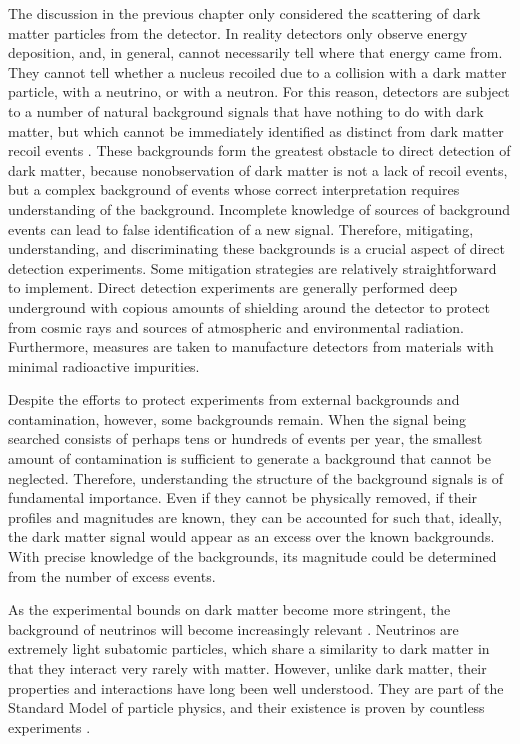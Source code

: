 The discussion in the previous chapter only considered the scattering of dark matter particles from the detector. In reality detectors only observe energy deposition, and, in general, cannot necessarily tell where that energy came from. They cannot tell whether a nucleus recoiled due to a collision with a dark matter particle, with a neutrino, or with a neutron. For this reason, detectors are subject to a number of natural background signals that have nothing to do with dark matter, but which cannot be immediately identified as distinct from dark matter recoil events \parencite{BaxterEtAl2022}. These backgrounds form the greatest obstacle to direct detection of dark matter, because nonobservation of dark matter is not a lack of recoil events, but a complex background of events whose correct interpretation requires understanding of the background. Incomplete knowledge of sources of background events can lead to false identification of a new signal. Therefore, mitigating, understanding, and discriminating these backgrounds is a crucial aspect of direct detection experiments. Some mitigation strategies are relatively straightforward to implement. Direct detection experiments are generally performed deep underground with copious amounts of shielding around the detector to protect from cosmic rays and sources of atmospheric and environmental radiation. Furthermore, measures are taken to manufacture detectors from materials with minimal radioactive impurities.

Despite the efforts to protect experiments from external backgrounds and contamination, however, some backgrounds remain. When the signal being searched consists of perhaps tens or hundreds of events per year, the smallest amount of contamination is sufficient to generate a background that cannot be neglected. Therefore, understanding the structure of the background signals is of fundamental importance. Even if they cannot be physically removed, if their profiles and magnitudes are known, they can be accounted for such that, ideally, the dark matter signal would appear as an excess over the known backgrounds. With precise knowledge of the backgrounds, its magnitude could be determined from the number of excess events.

As the experimental bounds on dark matter become more stringent, the background of neutrinos will become increasingly relevant \parencites{OHare2016, GaspertGiampaMorrissey2022}. Neutrinos are extremely light subatomic particles, which share a similarity to dark matter in that they interact very rarely with matter. However, unlike dark matter, their properties and interactions have long been well understood. They are part of the Standard Model of particle physics, and their existence is proven by countless experiments \parencites{AharmimEtAl2013, AnEtAl2017, BasilicoEtAl2023, AbbasiEtAl2024, AbeEtAl2024, AbratenkoEtAl2024}. 


